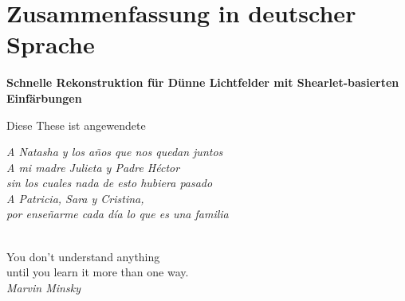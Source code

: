 \documentclass[11pt, english, singlespacing, headsepline, ]{MastersDoctoralThesis}
\theoremstyle{definition}
\begin{document}
 
\clearpage\pagestyle{empty}
\section*{Zusammenfassung in deutscher Sprache}

\begin{center}
\textbf{Schnelle Rekonstruktion für Dünne Lichtfelder mit Shearlet-basierten Einfärbungen}
\end{center}

Diese These ist angewendete

\clearpage\pagestyle{empty}
\begin{flushleft}
\textit{A Natasha y los años que nos quedan juntos\\
A mi madre Julieta y Padre Héctor \\
sin los cuales nada de esto hubiera pasado\\
A Patricia, Sara y Cristina, \\
por enseñarme cada día lo que es una familia}
\end{flushleft}



\cleardoublepage
 $\mbox{}$\\
You don't understand anything \\
until you learn it more than one way.
\\
\textit{Marvin Minsky}





\end{document}

